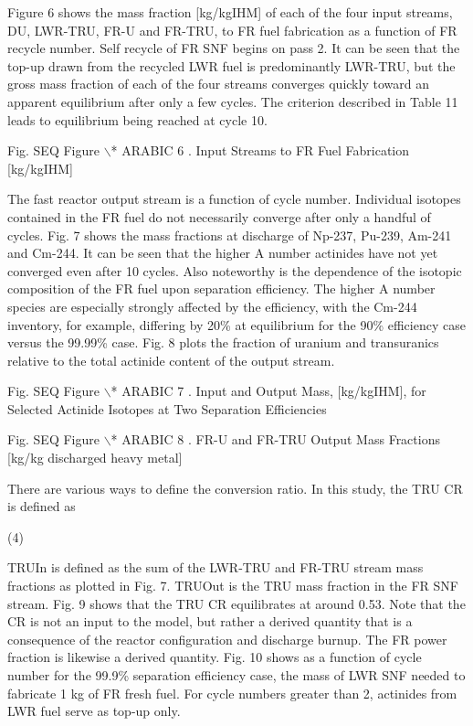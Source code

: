 	Figure 6 shows the mass fraction [kg/kgIHM] of each of the four
input streams, DU, LWR-TRU, FR-U and FR-TRU, to FR fuel fabrication as a
function of FR recycle number.  Self recycle of FR SNF begins on pass 2.
 It can be seen that the top-up drawn from the recycled LWR fuel is
predominantly LWR-TRU, but the gross mass fraction of each of the four
streams converges quickly toward an apparent equilibrium after only a
few cycles.  The criterion described in Table 11 leads to equilibrium
being reached at cycle 10.

Fig.   SEQ Figure $\backslash$* ARABIC  6 . Input Streams to FR Fuel
Fabrication [kg/kgIHM]

	The fast reactor output stream is a function of cycle number. 
Individual isotopes contained in the FR fuel do not necessarily converge
after only a handful of cycles.  Fig. 7 shows the mass fractions at
discharge of Np-237, Pu-239, Am-241 and Cm-244.  It can be seen that the
higher A number actinides have not yet converged even after 10 cycles. 
Also noteworthy is the dependence of the isotopic composition of the FR
fuel upon separation efficiency.  The higher A number species are
especially strongly affected by the efficiency, with the Cm-244
inventory, for example, differing by 20\% at equilibrium for the 90\%
efficiency case versus the 99.99\% case.  Fig. 8 plots the fraction of
uranium and transuranics relative to the total actinide content of the
output stream.

Fig.   SEQ Figure $\backslash$* ARABIC  7 .  Input and Output Mass,
[kg/kgIHM], for Selected Actinide Isotopes at Two Separation
Efficiencies

Fig.   SEQ Figure $\backslash$* ARABIC  8 . FR-U and FR-TRU Output Mass
Fractions [kg/kg discharged heavy metal]

	There are various ways to define the conversion ratio.  In this study,
the TRU CR is defined as

                     (4)

TRUIn is defined as the sum of the LWR-TRU and FR-TRU stream mass
fractions as plotted in Fig. 7.  TRUOut is the TRU mass fraction in the
FR SNF stream.  Fig. 9 shows that the TRU CR equilibrates at around
0.53.  Note that the CR is not an input to the model, but rather a
derived quantity that is a consequence of the reactor configuration and
discharge burnup.  The FR power fraction is likewise a derived quantity.
 Fig. 10 shows as a function of cycle number for the 99.9\% separation
efficiency case, the mass of LWR SNF needed to fabricate 1 kg of FR
fresh fuel.  For cycle numbers greater than 2, actinides from LWR fuel
serve as top-up only.  

